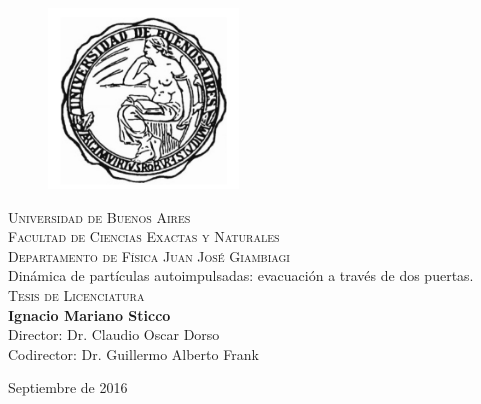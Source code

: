\thispagestyle{empty}

\begin{center}

 \begin{figure}[htb]
\centering
\includegraphics[width=0.45\textwidth]{caratula/logo.png}
\end{figure} 



\textsc{\LARGE Universidad de Buenos Aires}\\[0.5cm]
\textsc{\large Facultad de Ciencias Exactas y Naturales}\\[0.5cm]

\textsc{  Departamento de Física Juan José Giambiagi}\\[0.5cm]


\huge Dinámica de partículas autoimpulsadas: evacuación a través de dos puertas.\\

\textsc{\large Tesis de Licenciatura}\\[1cm]

{\LARGE \textbf{
Ignacio Mariano Sticco}} \\ [1cm]

\large
Director: Dr. Claudio Oscar Dorso \\[0.5cm]
Codirector: Dr. Guillermo Alberto Frank
\vfill


 Septiembre de 2016

\end{center}

\newpage


